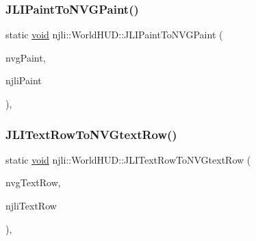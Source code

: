 \mbox{\label{classnjli_1_1_world_h_u_d_ac3b9b4cf14d03ba84789791fe171513e}} 
\subsubsection{\texorpdfstring{J\+L\+I\+Paint\+To\+N\+V\+G\+Paint()}{JLIPaintToNVGPaint()}}
{\footnotesize\ttfamily static \mbox{\hyperlink{_thread_8h_af1e856da2e658414cb2456cb6f7ebc66}{void}} njli\+::\+World\+H\+U\+D\+::\+J\+L\+I\+Paint\+To\+N\+V\+G\+Paint (\begin{DoxyParamCaption}\item[{N\+V\+Gpaint \&}]{nvg\+Paint,  }\item[{const \mbox{\hyperlink{structnjli_1_1_j_l_i_paint}{J\+L\+I\+Paint}} \&}]{njli\+Paint }\end{DoxyParamCaption})\hspace{0.3cm}{\ttfamily [static]}, {\ttfamily [protected]}}

\mbox{\label{classnjli_1_1_world_h_u_d_a63de1c69b918742522b6035270b6e635}} 
\subsubsection{\texorpdfstring{J\+L\+I\+Text\+Row\+To\+N\+V\+Gtext\+Row()}{JLITextRowToNVGtextRow()}}
{\footnotesize\ttfamily static \mbox{\hyperlink{_thread_8h_af1e856da2e658414cb2456cb6f7ebc66}{void}} njli\+::\+World\+H\+U\+D\+::\+J\+L\+I\+Text\+Row\+To\+N\+V\+Gtext\+Row (\begin{DoxyParamCaption}\item[{N\+V\+Gtext\+Row \&}]{nvg\+Text\+Row,  }\item[{const \mbox{\hyperlink{structnjli_1_1_j_l_i_text_row}{J\+L\+I\+Text\+Row}} \&}]{njli\+Text\+Row }\end{DoxyParamCaption})\hspace{0.3cm}{\ttfamily [static]}, {\ttfamily [protected]}}

